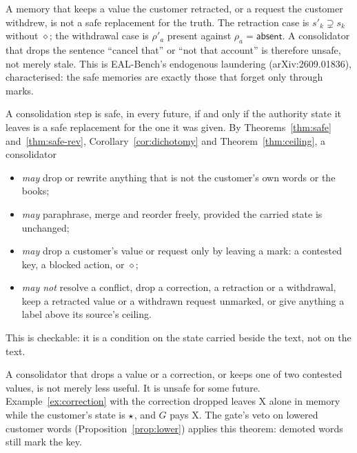 \begin{corollary}
A memory that keeps a value the customer retracted, or a request the customer withdrew, is not a
safe replacement for the truth. The retraction case is $s'_k \supsetneq s_k$ without $\diamond$; the
withdrawal case is $\rho'_a$ present against $\rho_a = \mathsf{absent}$. A consolidator that drops the
sentence ``cancel that'' or ``not that account'' is therefore unsafe, not merely stale. This is
EAL-Bench's endogenous laundering (arXiv:2609.01836), characterised: the safe memories are exactly
those that forget only through marks.
\end{corollary}

\begin{corollary}\label{cor:contract}
A consolidation step is safe, in every future, if and only if the authority state it leaves is a
safe replacement for the one it was given. By Theorems~\ref{thm:safe} and~\ref{thm:safe-rev},
Corollary~\ref{cor:dichotomy} and Theorem~\ref{thm:ceiling}, a consolidator
\begin{itemize}
\item \emph{may} drop or rewrite anything that is not the customer's own words or the books;
\item \emph{may} paraphrase, merge and reorder freely, provided the carried state is unchanged;
\item \emph{may} drop a customer's value or request only by leaving a mark: a contested key, a
  blocked action, or $\diamond$;
\item \emph{may not} resolve a conflict, drop a correction, a retraction or a withdrawal, keep a
  retracted value or a withdrawn request unmarked, or give anything a label above its source's
  ceiling.
\end{itemize}
This is checkable: it is a condition on the state carried beside the text, not on the text.
\end{corollary}

\begin{corollary}
A consolidator that drops a value or a correction, or keeps one of two contested values, is not
merely less useful. It is unsafe for some future. Example~\ref{ex:correction} with the correction
dropped leaves X alone in memory while the customer's state is $\star$, and $G$ pays X. The
gate's veto on lowered customer words (Proposition~\ref{prop:lower}) applies this theorem: demoted
words still mark the key.
\end{corollary}

